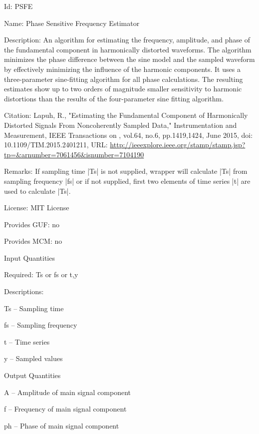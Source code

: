 \begin{tightdesc}
\item [Id:] PSFE
\item [Name:] Phase Sensitive Frequency Estimator
\item [Description:] An algorithm for estimating the frequency, amplitude, and phase of the fundamental component in harmonically distorted waveforms. The algorithm minimizes the phase difference between the sine model and the sampled waveform by effectively minimizing the influence of the harmonic components. It uses a three-parameter sine-fitting algorithm for all phase calculations. The resulting estimates show up to two orders of magnitude smaller sensitivity to harmonic distortions than the results of the four-parameter sine fitting algorithm.
\item [Citation:] Lapuh, R., "Estimating the Fundamental Component of Harmonically Distorted Signals From Noncoherently Sampled Data," Instrumentation and Measurement, IEEE Transactions on , vol.64, no.6, pp.1419,1424, June 2015, doi: 10.1109/TIM.2015.2401211, URL: \url{http://ieeexplore.ieee.org/stamp/stamp.jsp?tp=\&arnumber=7061456\&isnumber=7104190}
\item [Remarks:] If sampling time |Ts| is not supplied, wrapper will calculate |Ts| from sampling frequency |fs| or if not supplied, first two elements of time series |t| are used to calculate |Ts|.
\item [License:] MIT License
\item [Provides GUF:] no
\item [Provides MCM:] no
\item [Input Quantities] \rule{0em}{0em}
    \begin{tightdesc}
    \item [Required:] 
        \textsf{Ts} or \textsf{fs} or \textsf{t},\enspace \textsf{y}
    \end{tightdesc}
\item [Descriptions:] \rule{0em}{0em}
    \begin{tightdesc}
        \item[\textsf{Ts}] -- Sampling time
        \item[\textsf{fs}] -- Sampling frequency
        \item[\textsf{t}] -- Time series
        \item[\textsf{y}] -- Sampled values
    \end{tightdesc}
\item [Output Quantities] \rule{0em}{0em}
    \begin{tightdesc}
        \item[\textsf{A}] -- Amplitude of main signal component
        \item[\textsf{f}] -- Frequency of main signal component
        \item[\textsf{ph}] -- Phase of main signal component
    \end{tightdesc}
\end{tightdesc}
